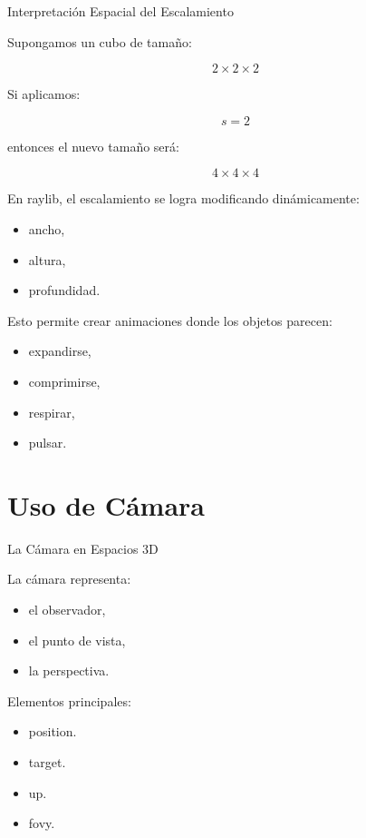 \documentclass{beamer}
\begin{document}
\begin{frame}{Interpretación Espacial del Escalamiento}

Supongamos un cubo de tamaño:

$$
2 \times 2 \times 2
$$

\vspace{0.4cm}

Si aplicamos:

$$
s = 2
$$

entonces el nuevo tamaño será:

$$
4 \times 4 \times 4
$$

\vspace{0.5cm}

En raylib, el escalamiento se logra modificando dinámicamente:

\begin{itemize}
    \item ancho,
    \item altura,
    \item profundidad.
\end{itemize}

\vspace{0.5cm}

Esto permite crear animaciones donde los objetos parecen:

\begin{itemize}
    \item expandirse,
    \item comprimirse,
    \item respirar,
    \item pulsar.
\end{itemize}

\end{frame}


\section{Uso de Cámara}

\begin{frame}{La Cámara en Espacios 3D}

La cámara representa:

\begin{itemize}
    \item el observador,
    \item el punto de vista,
    \item la perspectiva.
\end{itemize}

\vspace{0.4cm}

Elementos principales:

\begin{itemize}
    \item position.
    \item target.
    \item up.
    \item fovy.
\end{itemize}

\end{frame}
\end{document}
